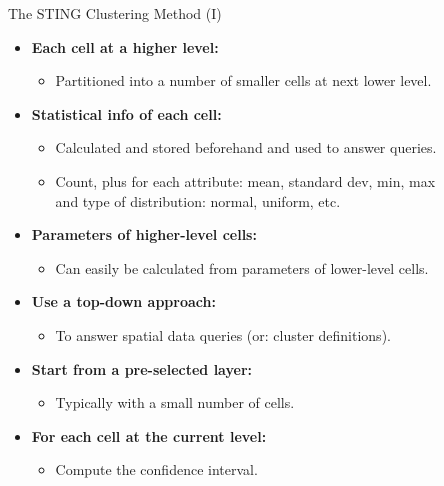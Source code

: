 \begin{frame}{The STING Clustering Method (I)}
	\begin{itemize}
		\item \textbf{Each cell at a higher level:}
		      \begin{itemize}
			      \item Partitioned into a number of smaller cells at next lower
			            level.
		      \end{itemize}
		\item \textbf{Statistical info of each cell:}
		      \begin{itemize}
			      \item Calculated and stored beforehand and used to answer queries.
			      \item Count, plus for each attribute: mean, standard dev, min, max \\
			            and type of distribution: normal, uniform, etc.
		      \end{itemize}
		\item \textbf{Parameters of higher-level cells:}
		      \begin{itemize}
			      \item Can easily be calculated from parameters of lower-level cells.
		      \end{itemize}
		\item \textbf{Use a top-down approach:}
		      \begin{itemize}
			      \item To answer spatial data queries (or: cluster definitions).
		      \end{itemize}
		\item \textbf{Start from a pre-selected layer:}
		      \begin{itemize}
			      \item Typically with a small number of cells.
		      \end{itemize}
		\item \textbf{For each cell at the current level:}
		      \begin{itemize}
			      \item Compute the confidence interval.
		      \end{itemize}
	\end{itemize}
\end{frame}

